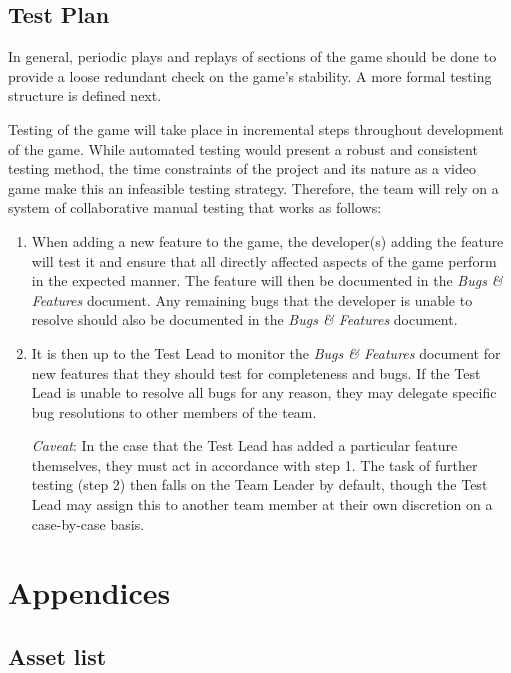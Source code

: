 \documentclass[12pt,titlepage]{article}
\begin{document}
\subsection{Test Plan}

In general, periodic plays and replays of sections of the game should be done to
provide a loose redundant check on the game's stability. A more formal testing
structure is defined next.

Testing of the game will take place in incremental steps throughout development
of the game. While automated testing would present a robust and consistent
testing method, the time constraints of the project and its nature as a video
game make this an infeasible testing strategy. Therefore, the team will rely on
a system of collaborative manual testing that works as follows:

\begin{enumerate}
    \item When adding a new feature to the game, the developer(s) adding the feature
        will test it and ensure that all directly affected aspects of the game
        perform in the expected manner. The feature will then be documented in the
        {\it Bugs \& Features} document. Any remaining bugs that the developer is
        unable to resolve should also be documented in the {\it Bugs \& Features}
        document.
    \item It is then up to the Test Lead to monitor the {\it Bugs \& Features}
        document for new features that they should test for completeness and bugs.
        If the Test Lead is unable to resolve all bugs for any reason, they may
        delegate specific bug resolutions to other members of the team.

        {\it Caveat}: In the case that the Test Lead has added a particular
        feature themselves, they must act in accordance with step 1. The task of
        further testing (step 2) then falls on the Team Leader by default, though
        the Test Lead may assign this to another team member at their own
        discretion on a case-by-case basis.
\end{enumerate}

\newpage
\section{Appendices}

\subsection{Asset list}
\end{document}
